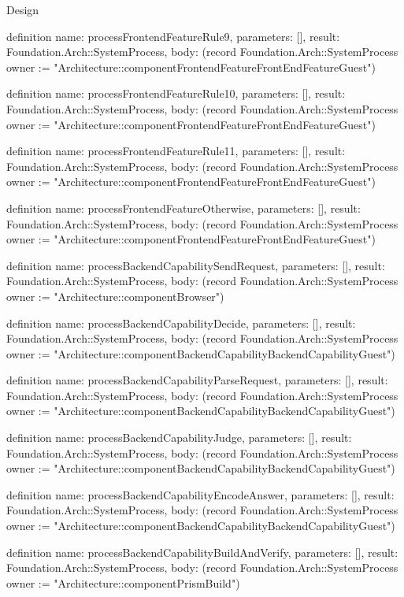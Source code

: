 \begin{lexlean}{Design}
\begin{semanticmodule}
definition{
  name: processFrontendFeatureRule9,
  parameters: [],
  result: Foundation.Arch::SystemProcess,
  body: (record Foundation.Arch::SystemProcess {owner := "Architecture::componentFrontendFeatureFrontEndFeatureGuest"})
}

definition{
  name: processFrontendFeatureRule10,
  parameters: [],
  result: Foundation.Arch::SystemProcess,
  body: (record Foundation.Arch::SystemProcess {owner := "Architecture::componentFrontendFeatureFrontEndFeatureGuest"})
}

definition{
  name: processFrontendFeatureRule11,
  parameters: [],
  result: Foundation.Arch::SystemProcess,
  body: (record Foundation.Arch::SystemProcess {owner := "Architecture::componentFrontendFeatureFrontEndFeatureGuest"})
}

definition{
  name: processFrontendFeatureOtherwise,
  parameters: [],
  result: Foundation.Arch::SystemProcess,
  body: (record Foundation.Arch::SystemProcess {owner := "Architecture::componentFrontendFeatureFrontEndFeatureGuest"})
}

definition{
  name: processBackendCapabilitySendRequest,
  parameters: [],
  result: Foundation.Arch::SystemProcess,
  body: (record Foundation.Arch::SystemProcess {owner := "Architecture::componentBrowser"})
}

definition{
  name: processBackendCapabilityDecide,
  parameters: [],
  result: Foundation.Arch::SystemProcess,
  body: (record Foundation.Arch::SystemProcess {owner := "Architecture::componentBackendCapabilityBackendCapabilityGuest"})
}

definition{
  name: processBackendCapabilityParseRequest,
  parameters: [],
  result: Foundation.Arch::SystemProcess,
  body: (record Foundation.Arch::SystemProcess {owner := "Architecture::componentBackendCapabilityBackendCapabilityGuest"})
}

definition{
  name: processBackendCapabilityJudge,
  parameters: [],
  result: Foundation.Arch::SystemProcess,
  body: (record Foundation.Arch::SystemProcess {owner := "Architecture::componentBackendCapabilityBackendCapabilityGuest"})
}

definition{
  name: processBackendCapabilityEncodeAnswer,
  parameters: [],
  result: Foundation.Arch::SystemProcess,
  body: (record Foundation.Arch::SystemProcess {owner := "Architecture::componentBackendCapabilityBackendCapabilityGuest"})
}

definition{
  name: processBackendCapabilityBuildAndVerify,
  parameters: [],
  result: Foundation.Arch::SystemProcess,
  body: (record Foundation.Arch::SystemProcess {owner := "Architecture::componentPrismBuild"})
}


\end{semanticmodule}
\end{lexlean}

